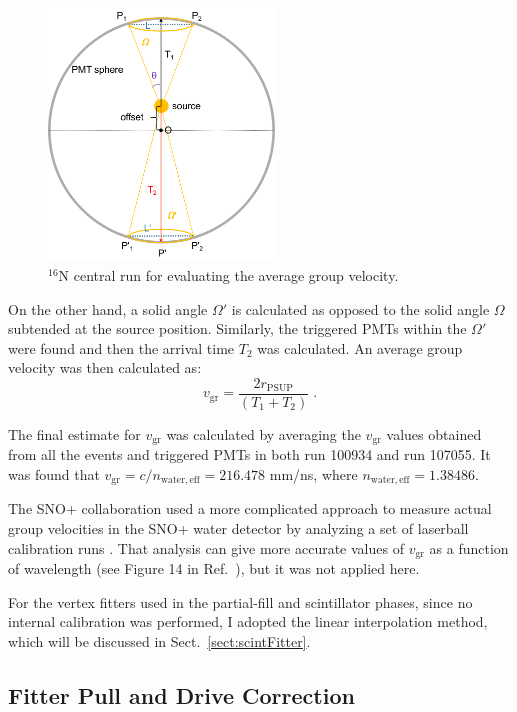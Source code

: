 \begin{figure}[!htb]
	\centering
	\includegraphics[width=6cm]{n16_groupVelocity.png}
	\caption{$^{16}$N central run for evaluating the average group velocity.}
	\label{fig:n16_groupVeloctiy}
\end{figure}

On the other hand, a solid angle $\Omega'$ is calculated as opposed to the solid angle $\Omega$ subtended at the source position. Similarly, the triggered PMTs within the $\Omega'$ were found and then the arrival time $T_2$ was calculated. An average group velocity was then calculated as:
\begin{equation}
v_\mathrm{gr}=\frac{2 r_\mathrm{PSUP}}{(T_1+T_2)}\;.
\end{equation}

The final estimate for $v_\mathrm{gr}$ was calculated by averaging the $v_\mathrm{gr}$ values obtained from all the events and triggered PMTs in both run 100934 and run 107055. It was found that $v_\mathrm{gr}=c/n_\mathrm{water,eff}=216.478$ mm/ns, where $n_\mathrm{water,eff}=1.38486$.

The SNO+ collaboration used a more complicated approach to measure actual group velocities in the SNO+ water detector by analyzing a set of laserball calibration runs \cite{anderson2021optical,groupVmeasure}. That analysis can give more accurate values of $v_\mathrm{gr}$ as a function of wavelength (see Figure 14 in Ref.~\cite{anderson2021optical}), but it was not applied here.

For the vertex fitters used in the partial-fill and scintillator phases, since no internal calibration was performed, I adopted the linear interpolation method, which will be discussed in Sect.~\ref{sect:scintFitter}.

\subsection{Fitter Pull and Drive Correction}\label{sect:fitterPull}

